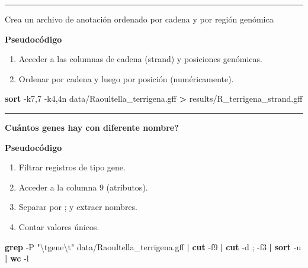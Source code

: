 \documentclass[
]{book}
\newenvironment{Shaded}{\begin{snugshade}}{\end{snugshade}}
\newcommand{\AttributeTok}[1]{\textcolor[rgb]{0.13,0.29,0.53}{#1}}
\newcommand{\FunctionTok}[1]{\textcolor[rgb]{0.13,0.29,0.53}{\textbf{#1}}}
\newcommand{\KeywordTok}[1]{\textcolor[rgb]{0.13,0.29,0.53}{\textbf{#1}}}
\newcommand{\NormalTok}[1]{#1}
\newcommand{\OperatorTok}[1]{\textcolor[rgb]{0.81,0.36,0.00}{\textbf{#1}}}
\newcommand{\StringTok}[1]{\textcolor[rgb]{0.31,0.60,0.02}{#1}}
\begin{document}
\begin{center}\rule{0.5\linewidth}{0.5pt}\end{center}

Crea un archivo de anotación ordenado por cadena y por región genómica

\textbf{Pseudocódigo}

\begin{enumerate}
\def\labelenumi{\arabic{enumi}.}
\item
  Acceder a las columnas de cadena (strand) y posiciones genómicas.
\item
  Ordenar por cadena y luego por posición (numéricamente).
\end{enumerate}

\begin{Shaded}
\begin{Highlighting}[]
\FunctionTok{sort} \AttributeTok{{-}k7,7} \AttributeTok{{-}k4,4n}\NormalTok{ data/Raoultella\_terrigena.gff }\OperatorTok{\textgreater{}}\NormalTok{ results/R\_terrigena\_strand.gff}
\end{Highlighting}
\end{Shaded}

\begin{center}\rule{0.5\linewidth}{0.5pt}\end{center}

\textbf{Cuántos genes hay con diferente nombre?}

\textbf{Pseudocódigo}

\begin{enumerate}
\def\labelenumi{\arabic{enumi}.}
\item
  Filtrar registros de tipo gene.
\item
  Acceder a la columna 9 (atributos).
\item
  Separar por ; y extraer nombres.
\item
  Contar valores únicos.
\end{enumerate}

\begin{Shaded}
\begin{Highlighting}[]
\FunctionTok{grep} \AttributeTok{{-}P} \StringTok{"\textbackslash{}tgene\textbackslash{}t"}\NormalTok{ data/Raoultella\_terrigena.gff }\KeywordTok{|} \FunctionTok{cut} \AttributeTok{{-}f9} \KeywordTok{|} \FunctionTok{cut} \AttributeTok{{-}d} \StringTok{\textquotesingle{};\textquotesingle{}} \AttributeTok{{-}f3} \KeywordTok{|} \FunctionTok{sort} \AttributeTok{{-}u} \KeywordTok{|} \FunctionTok{wc} \AttributeTok{{-}l}
\end{Highlighting}
\end{Shaded}
\end{document}
